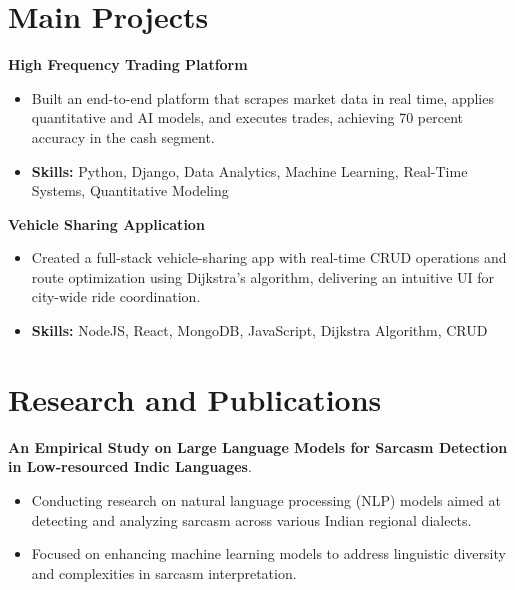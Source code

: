 \documentclass[a4paper,11pt]{article}
\begin{document}
\section{\textbf{Main Projects}}

\vspace{1mm}
  \textbf{High Frequency Trading Platform  }
\vspace{-1.5mm} %
\begin{itemize}
  \item Built an end-to-end platform that scrapes market data in real time, applies quantitative and AI models, and executes trades, achieving 70 percent accuracy in the cash segment.
\vspace{-3mm}
  \item \textbf{Skills:} Python, Django, Data Analytics, Machine Learning, Real-Time Systems, Quantitative Modeling
\end{itemize}


\vspace{1mm}
   \textbf{Vehicle Sharing Application }
\vspace{-1.5mm} %
\begin{itemize}
  \item Created a full-stack vehicle-sharing app with real-time CRUD operations and route optimization using Dijkstra's algorithm, delivering an intuitive UI for city-wide ride coordination.
\vspace{-3mm}
  \item \textbf{Skills:} NodeJS, React, MongoDB, JavaScript, Dijkstra Algorithm, CRUD
\end{itemize}



\section{\textbf{Research and Publications} \hfill }
\vspace{1mm}
  \textbf{An Empirical Study on Large Language Models for Sarcasm Detection in Low-resourced Indic Languages}.
\vspace{-1mm} %
\begin{itemize}
  \item Conducting research on natural language processing (NLP) models aimed at detecting and analyzing sarcasm across various Indian regional dialects.
\vspace{-3mm}
  \item Focused on enhancing machine learning models to address linguistic diversity and complexities in sarcasm interpretation.
\end{itemize}
\end{document}
